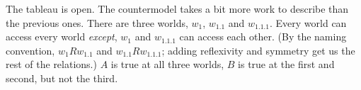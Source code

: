 \documentclass[10pt]{article}
\begin{document}
The tableau is open. The countermodel takes a bit more work to describe than the previous ones. There are three worlds, $w_1$, $w_{1.1}$ and $w_{1.1.1}$. Every world can access every world \textit{except}, $w_1$ and $w_{1.1.1}$ can access each other. (By the naming convention, $w_1Rw_{1.1}$ and $w_{1.1}Rw_{1.1.1}$; adding reflexivity and symmetry get us the rest of the relations.) $A$ is true at all three worlds, $B$ is true at the first and second, but not the third.
\end{document}
